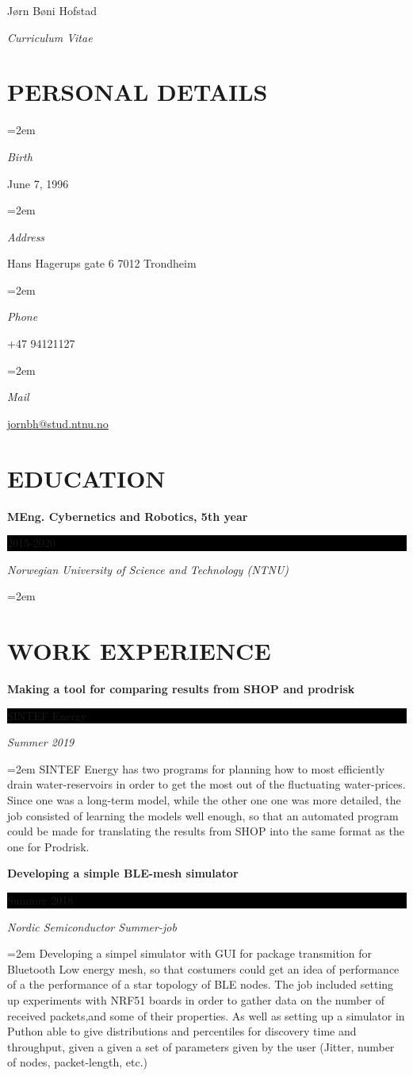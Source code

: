 \documentclass[paper=a4,fontsize=11pt,norsk]{scrartcl} %
\newlength{\spacebox}
\newcommand{\sepspace}{\vspace*{1em}}		%
\newcommand{\MyName}[1]{ %
		\Huge \usefont{OT1}{phv}{b}{n} \hfill #1
		\par \normalsize \normalfont}
\newcommand{\MySlogan}[1]{ %
		\large \usefont{OT1}{phv}{m}{n}\hfill \textit{#1}
		\par \normalsize \normalfont}
\newcommand{\NewPart}[1]{\section*{\uppercase{#1}}}
\newcommand{\PersonalEntry}[2]{
		\noindent\hangindent=2em\hangafter=0 %
		\parbox{\spacebox}{        %
		\textit{#1}}		       %
		\hspace{1.5em} #2 \par}    %
\newcommand{\EducationEntry}[4]{
		\noindent \textbf{#1} \hfill      %
		\colorbox{Black}{%
			\parbox{6em}{%
			\hfill\color{White}#2}} \par  %
		\noindent \textit{#3} \par        %
		\noindent\hangindent=2em\hangafter=0 \small #4 %
		\normalsize \par}
\begin{document}

\MyName{Jørn Bøni Hofstad}
\MySlogan{Curriculum Vitae}

\sepspace

\NewPart{Personal details}{}

\PersonalEntry{Birth}{June 7, 1996}
\PersonalEntry{Address}{Hans Hagerups gate 6 7012 Trondheim}
\PersonalEntry{Phone}{+47 94121127}
\PersonalEntry{Mail}{\url{jornbh@stud.ntnu.no}}

\NewPart{Education}{}

\EducationEntry{MEng. Cybernetics and Robotics, 5th year}{2015-2020}{Norwegian University of Science and Technology (NTNU)}{}
\sepspace

\NewPart{Work experience}{}
\EducationEntry{Making a tool for comparing results from SHOP and prodrisk}{SINTEF Energy}{Summer 2019}{
SINTEF Energy has two programs for planning how to most efficiently drain water-reservoirs in order to get the most out of the fluctuating water-prices. Since one was a long-term model, while the other one one was more detailed, the job consisted of learning the models well enough, so that an automated program could be made for translating the results from SHOP into the same format as the one for Prodrisk.  
}

\EducationEntry{Developing a simple BLE-mesh simulator}{Summer 2018}{Nordic Semiconductor Summer-job}{
Developing a simpel simulator with GUI for package transmition for Bluetooth Low energy mesh, so that costumers could get an idea of performance of a the performance of a star topology of BLE nodes. The job included setting up experiments with NRF51 boards in order to gather data on the number of received packets,and some of their properties. As well as setting up a simulator in Puthon able to give distributions and percentiles for discovery time and throughput, given a given a set of parameters given by the user (Jitter, number of nodes, packet-length, etc.) 

}
\end{document}
